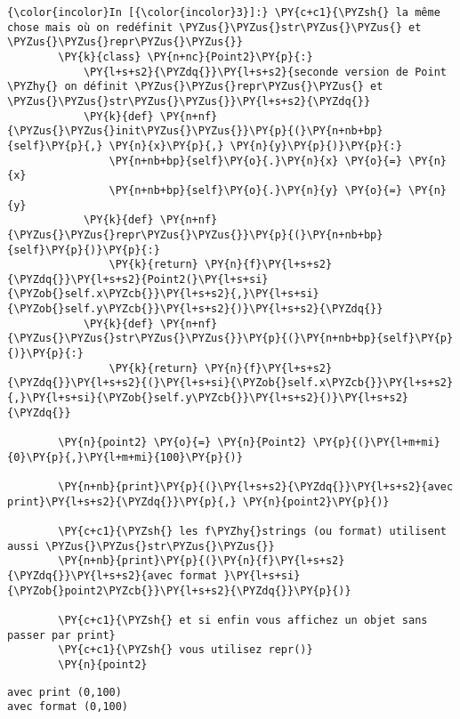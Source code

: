     \begin{Verbatim}[commandchars=\\\{\}]
{\color{incolor}In [{\color{incolor}3}]:} \PY{c+c1}{\PYZsh{} la même chose mais où on redéfinit \PYZus{}\PYZus{}str\PYZus{}\PYZus{} et \PYZus{}\PYZus{}repr\PYZus{}\PYZus{}}
        \PY{k}{class} \PY{n+nc}{Point2}\PY{p}{:}
            \PY{l+s+s2}{\PYZdq{}}\PY{l+s+s2}{seconde version de Point \PYZhy{} on définit \PYZus{}\PYZus{}repr\PYZus{}\PYZus{} et \PYZus{}\PYZus{}str\PYZus{}\PYZus{}}\PY{l+s+s2}{\PYZdq{}}
            \PY{k}{def} \PY{n+nf}{\PYZus{}\PYZus{}init\PYZus{}\PYZus{}}\PY{p}{(}\PY{n+nb+bp}{self}\PY{p}{,} \PY{n}{x}\PY{p}{,} \PY{n}{y}\PY{p}{)}\PY{p}{:}
                \PY{n+nb+bp}{self}\PY{o}{.}\PY{n}{x} \PY{o}{=} \PY{n}{x}
                \PY{n+nb+bp}{self}\PY{o}{.}\PY{n}{y} \PY{o}{=} \PY{n}{y}
            \PY{k}{def} \PY{n+nf}{\PYZus{}\PYZus{}repr\PYZus{}\PYZus{}}\PY{p}{(}\PY{n+nb+bp}{self}\PY{p}{)}\PY{p}{:}
                \PY{k}{return} \PY{n}{f}\PY{l+s+s2}{\PYZdq{}}\PY{l+s+s2}{Point2(}\PY{l+s+si}{\PYZob{}self.x\PYZcb{}}\PY{l+s+s2}{,}\PY{l+s+si}{\PYZob{}self.y\PYZcb{}}\PY{l+s+s2}{)}\PY{l+s+s2}{\PYZdq{}}
            \PY{k}{def} \PY{n+nf}{\PYZus{}\PYZus{}str\PYZus{}\PYZus{}}\PY{p}{(}\PY{n+nb+bp}{self}\PY{p}{)}\PY{p}{:}
                \PY{k}{return} \PY{n}{f}\PY{l+s+s2}{\PYZdq{}}\PY{l+s+s2}{(}\PY{l+s+si}{\PYZob{}self.x\PYZcb{}}\PY{l+s+s2}{,}\PY{l+s+si}{\PYZob{}self.y\PYZcb{}}\PY{l+s+s2}{)}\PY{l+s+s2}{\PYZdq{}}
            
        \PY{n}{point2} \PY{o}{=} \PY{n}{Point2} \PY{p}{(}\PY{l+m+mi}{0}\PY{p}{,}\PY{l+m+mi}{100}\PY{p}{)}
        
        \PY{n+nb}{print}\PY{p}{(}\PY{l+s+s2}{\PYZdq{}}\PY{l+s+s2}{avec print}\PY{l+s+s2}{\PYZdq{}}\PY{p}{,} \PY{n}{point2}\PY{p}{)}
        
        \PY{c+c1}{\PYZsh{} les f\PYZhy{}strings (ou format) utilisent aussi \PYZus{}\PYZus{}str\PYZus{}\PYZus{}}
        \PY{n+nb}{print}\PY{p}{(}\PY{n}{f}\PY{l+s+s2}{\PYZdq{}}\PY{l+s+s2}{avec format }\PY{l+s+si}{\PYZob{}point2\PYZcb{}}\PY{l+s+s2}{\PYZdq{}}\PY{p}{)}
        
        \PY{c+c1}{\PYZsh{} et si enfin vous affichez un objet sans passer par print}
        \PY{c+c1}{\PYZsh{} vous utilisez repr()}
        \PY{n}{point2}
\end{Verbatim}


    \begin{Verbatim}[commandchars=\\\{\}]
avec print (0,100)
avec format (0,100)

    \end{Verbatim}

